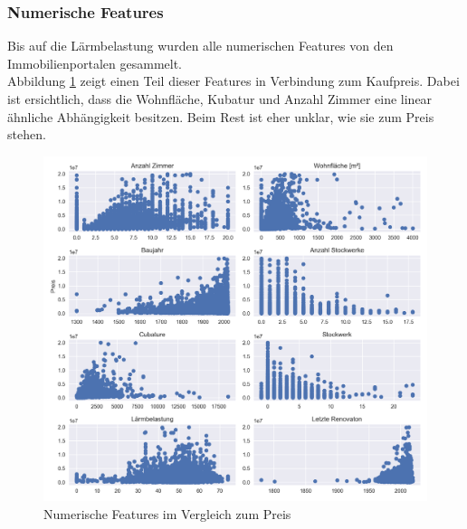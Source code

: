 \begin{table}[ht]
\centering
{}
\caption{Statistische Werte des Kaufpreises}
\label{tab:price}
\end{table}

\subsubsection{Numerische Features}
Bis auf die Lärmbelastung wurden alle numerischen Features von den Immobilienportalen gesammelt.\\
Abbildung \ref{fig:num_features} zeigt einen Teil dieser Features in Verbindung zum Kaufpreis. Dabei ist ersichtlich, dass die Wohnfläche, Kubatur und Anzahl Zimmer eine linear ähnliche Abhängigkeit besitzen. Beim Rest ist eher unklar, wie sie zum Preis stehen.

\begin{figure}[h]
\centering
\includegraphics[width=\textwidth]{images/Vergleich_zum_preis.png}
\caption[Numerische Features im Vergleich zum Preis]{Numerische Features im Vergleich zum Preis}%
\label{fig:num_features}
\end{figure}

